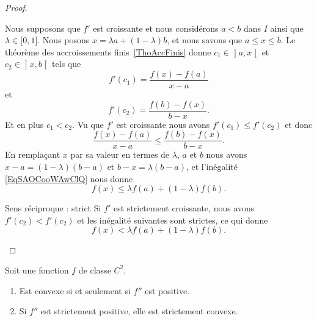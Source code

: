 \begin{proof}
\begin{subproof}
        Nous supposons que \( f'\) est croissante et nous considérons \( a<b\) dans \( I\) ainsi que \( \lambda\in \mathopen[ 0 , 1 \mathclose]\). Nous posons \( x=\lambda a+(1-\lambda)b\), et nous savons que \( a\leq x\leq b\). Le théorème des accroissements finis~\ref{ThoAccFinis} donne \( c_1\in\mathopen] a , x \mathclose[\) et \( c_2\in \mathopen] x , b \mathclose[\) tels que
        \begin{equation}
            f'(c_1)=\frac{ f(x)-f(a) }{ x-a }
        \end{equation}
        et
        \begin{equation}
            f'(c_2)=\frac{ f(b)-f(x) }{ b-x }.
        \end{equation}
        Et en plus \( c_1<c_2\). Vu que \( f'\) est croissante nous avons \( f'(c_1)\leq f'(c_2)\) et donc
        \begin{equation}       \label{EqSAOCooWAwClQ}
            \frac{ f(x)-f(a) }{ x-a }\leq\frac{ f(b)-f(x) }{ b-x }.
        \end{equation}
        En remplaçant \( x\) par sa valeur en termes de \( \lambda\), \( a\) et \( b\) nous avons \( x-a=(1-\lambda)(b-a)\) et \( b-x=\lambda(b-a)\), et l'inégalité \eqref{EqSAOCooWAwClQ} nous donne
        \begin{equation}
            f(x)\leq \lambda f(a)+(1-\lambda)f(b).
        \end{equation}
    \item[Sens réciproque : strict]
        Si \( f'\) est strictement croissante, nous avons \( f'(c_2)<f'(c_2)\) et les inégalité suivantes sont strictes, ce qui donne
        \begin{equation}
            f(x)< \lambda f(a)+(1-\lambda)f(b).
        \end{equation}
    \end{subproof}
\end{proof}

\begin{theorem} \label{ThoGXjKeYb}
    Soit une fonction \( f\) de classe \( C^2\).
    \begin{enumerate}
        \item       \label{ITEMooIUTQooTkRMoyBP}
            Est convexe si et seulement si \( f''\) est positive.
        \item       \label{ITEMooXUOMooYIoOtv}
            Si \( f''\) est strictement positive, elle est strictement convexe.
    \end{enumerate}
\end{theorem}

